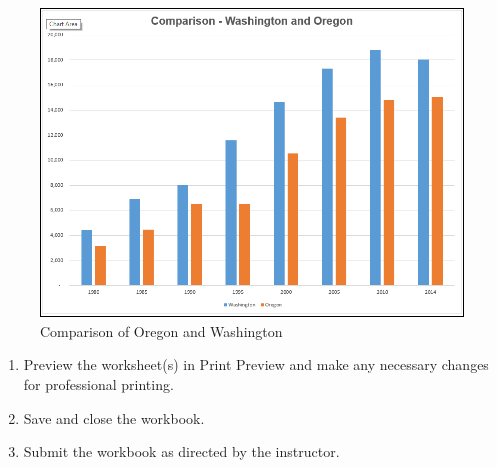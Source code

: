 \begin{figure}[H]
	\centering
	\includegraphics[width=\maxwidth{.95\linewidth}]{gfx/ch04_fig59}
	\caption{Comparison of Oregon and Washington}
	\label{04:fig59}
\end{figure}

\begin{enumbox}
	\begin{enumerate}
		\item Preview the worksheet(s) in Print Preview and make any necessary changes for professional printing.
		\item Save and close the  workbook. 
		\item Submit the  workbook as directed by the instructor.
	\end{enumerate}
\end{enumbox}